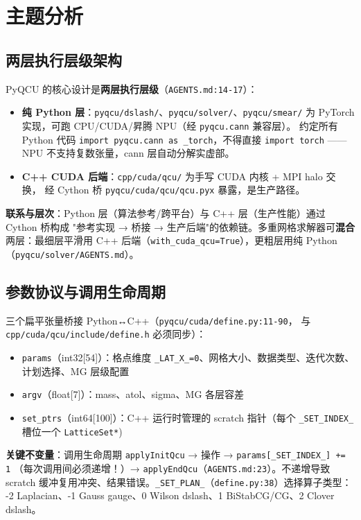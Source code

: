 \documentclass[UTF8]{ctexart}
\begin{document}
\section{主题分析}

\subsection{两层执行层级架构}

PyQCU 的核心设计是\textbf{两层执行层级}（\texttt{AGENTS.md:14-17}）：

\begin{itemize}
  \item \textbf{纯 Python 层}：\texttt{pyqcu/dslash/}、\texttt{pyqcu/solver/}、\texttt{pyqcu/smear/}
        为 PyTorch 实现，可跑 CPU/CUDA/昇腾 NPU（经 \texttt{pyqcu.cann} 兼容层）。
        约定所有 Python 代码 \texttt{import pyqcu.cann as \_torch}，不得直接 \texttt{import torch}
        —— NPU 不支持复数张量，cann 层自动分解实虚部。
  \item \textbf{C++ CUDA 后端}：\texttt{cpp/cuda/qcu/} 为手写 CUDA 内核 + MPI halo 交换，
        经 Cython 桥 \texttt{pyqcu/cuda/qcu/qcu.pyx} 暴露，是生产路径。
\end{itemize}

\textbf{联系与层次}：Python 层（算法参考/跨平台）与 C++ 层（生产性能）通过 Cython 桥构成
"参考实现 → 桥接 → 生产后端"的依赖链。多重网格求解器可\textbf{混合}两层：最细层平滑用 C++
后端（\texttt{with\_cuda\_qcu=True}），更粗层用纯 Python（\texttt{pyqcu/solver/AGENTS.md}）。

\subsection{参数协议与调用生命周期}

三个扁平张量桥接 Python↔C++（\texttt{pyqcu/cuda/define.py:11-90}，
与 \texttt{cpp/cuda/qcu/include/define.h} 必须同步）：

\begin{itemize}
  \item \texttt{params}（int32[54]）：格点维度 \texttt{\_LAT\_X\_=0}、网格大小、数据类型、迭代次数、计划选择、MG 层级配置
  \item \texttt{argv}（float[7]）：mass、atol、sigma、MG 各层容差
  \item \texttt{set\_ptrs}（int64[100]）：C++ 运行时管理的 scratch 指针（每个 \texttt{\_SET\_INDEX\_} 槽位一个 \texttt{LatticeSet*})
\end{itemize}

\textbf{关键不变量}：调用生命周期 \texttt{applyInitQcu} → 操作 → \texttt{params[\_SET\_INDEX\_] += 1}
（每次调用间必须递增！）→ \texttt{applyEndQcu}（\texttt{AGENTS.md:23}）。不递增导致 scratch
缓冲复用冲突、结果错误。\texttt{\_SET\_PLAN\_}（\texttt{define.py:38}）选择算子类型：
-2 Laplacian、-1 Gauss gauge、0 Wilson dslash、1 BiStabCG/CG、2 Clover dslash。
\end{document}
